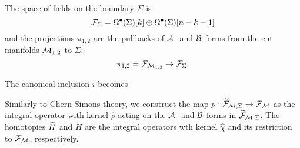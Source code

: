 The space of fields on the boundary $\Sigma$ is
\begin{equation*}
    \mathcal{F}_\Sigma = 
    \Omega^\bullet (\Sigma)[k] \oplus
    \Omega^\bullet (\Sigma)[n-k-1]
\end{equation*}
and the projections $\pi_{1,2}$ are the pullbacks of $\mathcal{A}$- and $\mathcal{B}$-forms from the cut manifolds $\mathcal{M}_{1, 2}$ to $\Sigma$:
\begin{equation*}
    \pi_{1, 2} = \mathcal{F}_{\mathcal{M}_{1, 2}} \rightarrow \mathcal{F}_\Sigma .
\end{equation*}

The canonical inclusion $i$ becomes
\begin{equation*}
    
\end{equation*}

Similarly to Chern-Simons theory, we construct the map $p: \widetilde{\mathcal{F}}_{\mathcal{M}, \Sigma} \rightarrow \mathcal{F}_{\mathcal{M}}$ as the integral operator with kernel $\hat{\rho}$ acting on the $\mathcal{A}$- and $\mathcal{B}$-forms in $\widetilde{\mathcal{F}}_{\mathcal{M}, \Sigma}$.
The homotopies $\widetilde{H}$ and $H$ are the integral operators wth kernel $\hat{\chi}$ and its restriction to $\mathcal{F}_{\mathcal{M}}$, respectively.